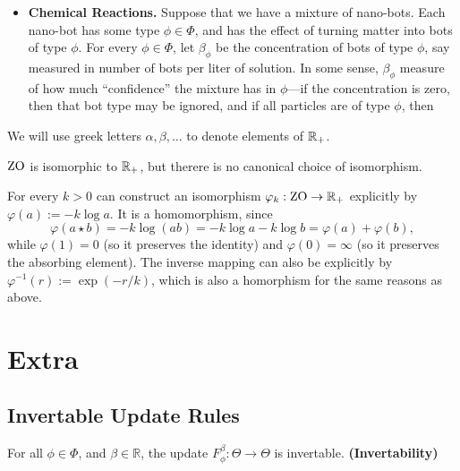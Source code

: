 \begin{itemize}
\begin{itemize}
		\item \textbf{Chemical Reactions.}
		Suppose that we have a mixture of nano-bots.
		Each nano-bot has some type $\phi \in \Phi$, and has the effect of turning matter into bots of type $\phi$.
		For every $\phi \in \Phi$, let $\beta_\phi$ be the concentration of bots of type $\phi$, say measured in number of bots per liter of solution.
		In some sense, $\beta_\phi$ measure of how much ``confidence'' the mixture has in $\phi$---if the concentration is zero, then that bot type may be ignored, and if all particles are of type $\phi$, then

		\TODO


	\end{itemize}

	We will use greek letters $\alpha, \beta, \ldots$ to denote elements of $\mathbb R_+$.

\end{itemize}


\begin{prop}
	$\mathrm{ZO}$ is isomorphic to $\mathbb R_+$, but therere is no canonical choice of isomorphism.
\end{prop}
\begin{lproof}
	For every $k > 0$ can construct an isomorphism $\varphi_k: \mathrm{ZO} \to \mathbb R_+$ explicitly by $\varphi(a) := - k \log a$.
	It is a homomorphism, since
	\[
		\varphi(a \star b) = - k \log (a b) = - k \log a - k \log b =
			\varphi(a) + \varphi(b),
	\]
	while $\varphi(1) = 0$ (so it preserves the identity) and $\varphi(0) = \infty$ (so it preserves the absorbing element).
	The inverse mapping can also be explicitly by $\varphi^{-1}(r) := \exp( - r / k)$, which is also a homorphism for the same reasons as above.
\end{lproof}


\section{Extra}

\subsection{Invertable Update Rules}

\begin{CFaxioms}
	\item For all $\phi\in\Phi$, and $\beta \in \mathbb R$, the update
	$F^{\beta}_{\phi}: \Theta \to \Theta$ is invertable.
	\hfill\textbf{(Invertability)} \label{ax:invert}
\end{CFaxioms}


